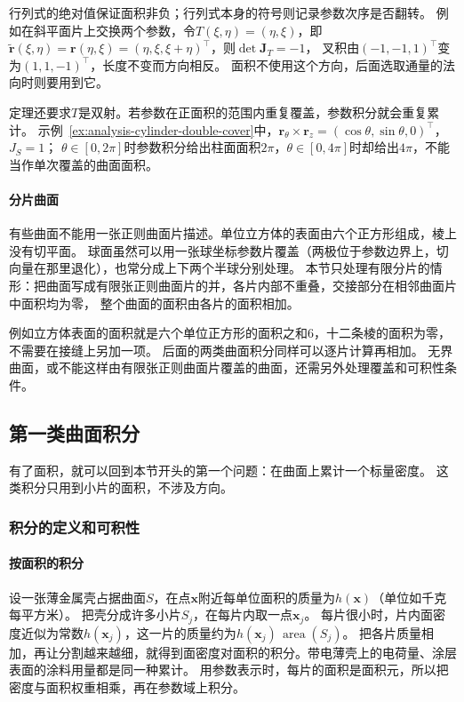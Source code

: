 行列式的绝对值保证面积非负；行列式本身的符号则记录参数次序是否翻转。
例如在斜平面片上交换两个参数，令$T(\xi,\eta)=(\eta,\xi)$，即$\widetilde{\bm r}(\xi,\eta)=\bm r(\eta,\xi)=(\eta,\xi,\xi+\eta)^\top$，则$\det\bm J_T=-1$，
叉积由$(-1,-1,1)^\top$变为$(1,1,-1)^\top$，长度不变而方向相反。
面积不使用这个方向，后面选取通量的法向时则要用到它。

定理还要求$T$是双射。若参数在正面积的范围内重复覆盖，参数积分就会重复累计。
示例~\ref{ex:analysis-cylinder-double-cover}中，$\bm r_\theta\times\bm r_z=(\cos\theta,\sin\theta,0)^\top$，$J_S=1$；
$\theta\in[0,2\pi]$时参数积分给出柱面面积$2\pi$，$\theta\in[0,4\pi]$时却给出$4\pi$，不能当作单次覆盖的曲面面积。

\paragraph{分片曲面}

有些曲面不能用一张正则曲面片描述。单位立方体的表面由六个正方形组成，棱上没有切平面。
球面虽然可以用一张球坐标参数片覆盖（两极位于参数边界上，切向量在那里退化），也常分成上下两个半球分别处理。
本节只处理有限分片的情形：把曲面写成有限张正则曲面片的并，各片内部不重叠，交接部分在相邻曲面片中面积均为零，
整个曲面的面积由各片的面积相加。

例如立方体表面的面积就是六个单位正方形的面积之和$6$，十二条棱的面积为零，不需要在接缝上另加一项。
后面的两类曲面积分同样可以逐片计算再相加。
无界曲面，或不能这样由有限张正则曲面片覆盖的曲面，还需另外处理覆盖和可积性条件。

\subsection{第一类曲面积分}

有了面积，就可以回到本节开头的第一个问题：在曲面上累计一个标量密度。
这类积分只用到小片的面积，不涉及方向。

\subsubsection{积分的定义和可积性}

\paragraph{按面积的积分}

设一张薄金属壳占据曲面$S$，在点$\bm x$附近每单位面积的质量为$h(\bm x)$（单位如千克每平方米）。
把壳分成许多小片$S_j$，在每片内取一点$\bm x_j$。
每片很小时，片内面密度近似为常数$h(\bm x_j)$，这一片的质量约为$h(\bm x_j)\,\operatorname{area}(S_j)$。
把各片质量相加，再让分割越来越细，就得到面密度对面积的积分。带电薄壳上的电荷量、涂层表面的涂料用量都是同一种累计。
用参数表示时，每片的面积是面积元，所以把密度与面积权重相乘，再在参数域上积分。

